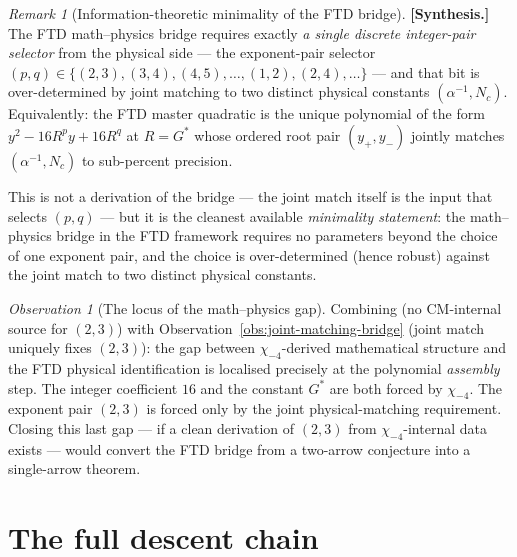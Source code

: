 \documentclass[11pt]{amsart}
\theoremstyle{plain}
\theoremstyle{definition}
\theoremstyle{remark}
\newtheorem*{remark}{Remark}
\newtheorem*{observation}{Observation}
\newcommand{\Gs}{G^{*}}
\begin{document}
\begin{remark}[Information-theoretic minimality of the FTD bridge]\label{rem:bridge-minimality}
\textbf{[Synthesis.]} The FTD math--physics bridge requires exactly
\emph{a single discrete integer-pair selector} from the physical side --- the exponent-pair
selector $(p, q) \in \{(2, 3), (3, 4), (4, 5), \ldots, (1, 2), (2, 4), \ldots\}$ ---
and that bit is over-determined by joint matching to two distinct
physical constants $(\alpha^{-1}, N_{c})$. Equivalently: the FTD master
quadratic is the unique polynomial of the form $y^{2} - 16 R^{p} y + 16 R^{q}$
at $R = \Gs$ whose ordered root pair $(y_{+}, y_{-})$ jointly matches
$(\alpha^{-1}, N_{c})$ to sub-percent precision.

This is not a derivation of the bridge --- the joint match itself is the
input that selects $(p, q)$ --- but it is the cleanest available
\emph{minimality statement}: the math--physics bridge in the FTD
framework requires no parameters beyond the choice of one exponent
pair, and the choice is over-determined (hence robust) against the joint
match to two distinct physical constants.
\end{remark}

\begin{observation}[The locus of the math--physics gap]\label{obs:gap-locus}
Combining \cite[\S 16.5]{paper-gstar-A} (no CM-internal source for $(2, 3)$)
with Observation~\ref{obs:joint-matching-bridge} (joint match uniquely
fixes $(2, 3)$): the gap between $\chi_{-4}$-derived mathematical
structure and the FTD physical identification is localised precisely at
the polynomial \emph{assembly} step. The integer coefficient $16$ and
the constant $\Gs$ are both forced by $\chi_{-4}$. The exponent pair
$(2, 3)$ is forced only by the joint physical-matching requirement.
Closing this last gap --- if a clean derivation of $(2, 3)$ from
$\chi_{-4}$-internal data exists --- would convert the FTD bridge from
a two-arrow conjecture into a single-arrow theorem.
\end{observation}

\section{The full descent chain}\label{sec:descent}
\end{document}
